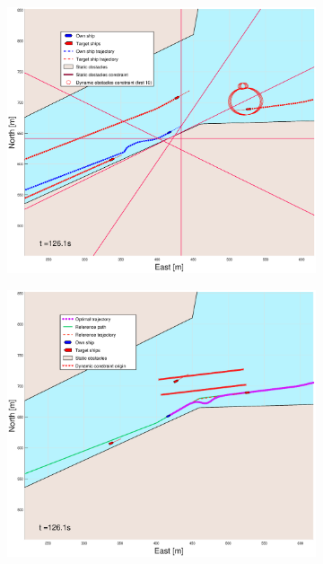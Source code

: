 \begin{figure}[!ht]
\begin{subfigure}[b]{0.499\textwidth}
    \end{subfigure}
    \hfill
    \\
    \begin{subfigure}[b]{0.49\textwidth}
        \centering
        \includegraphics[width=\textwidth]{Images/Figures/Trheimfjord/_Simple_1fig1_time=126}
    \end{subfigure}
    \hfill
    \begin{subfigure}[b]{0.499\textwidth}
        \centering
        \includegraphics[width=\textwidth]{Images/Figures/Trheimfjord/_Simple_1fig999_time=126}

\end{subfigure}
\end{figure}
